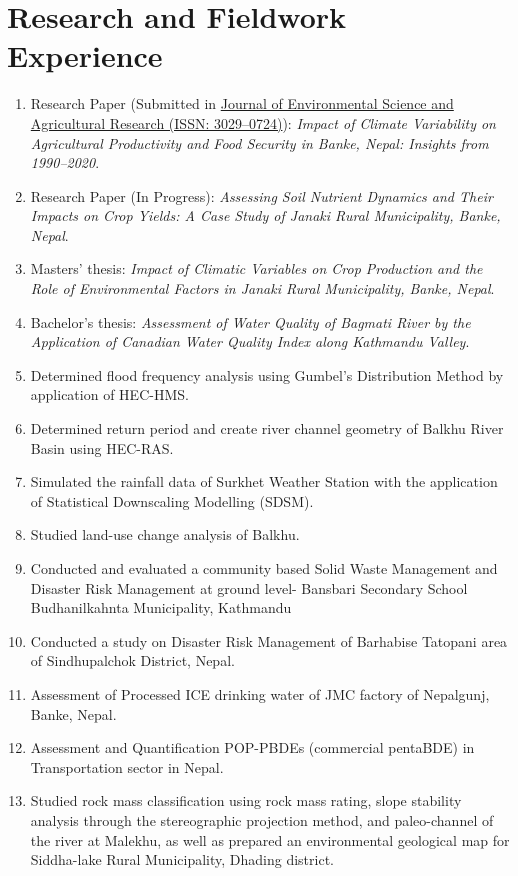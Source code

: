 \documentclass[a4paper,11.5pt]{article}
\begin{document}
\section{Research and Fieldwork Experience}
\begin{enumerate}
    \item Research Paper (Submitted in \href{https://oaskpublishers.com/journal-of-environmental-science-and-agricultural-research-jesar-home}{Journal of Environmental Science and Agricultural Research (ISSN: 3029--0724)}): \textit{Impact of Climate Variability on Agricultural Productivity and Food Security in Banke, Nepal: Insights from 1990--2020}.
    \item Research Paper (In Progress): \textit{Assessing Soil Nutrient Dynamics and Their Impacts on Crop Yields: A Case Study of Janaki Rural Municipality, Banke, Nepal}.
    \item Masters’ thesis: \textit{Impact of Climatic Variables on Crop Production and the Role of Environmental Factors in Janaki Rural Municipality, Banke, Nepal}.
    \item Bachelor's thesis: \textit{Assessment of Water Quality of Bagmati River by the Application of Canadian Water Quality Index along Kathmandu Valley}.
    \item Determined flood frequency analysis using Gumbel’s Distribution Method by application of HEC-HMS.
    \item Determined return period and create river channel geometry of Balkhu River Basin using HEC-RAS.
    \item Simulated the rainfall data of Surkhet Weather Station with the application of Statistical Downscaling Modelling (SDSM).
    \item Studied land-use change analysis of Balkhu.
    \item Conducted and evaluated a community based Solid Waste Management and Disaster Risk Management at ground level- Bansbari Secondary School Budhanilkahnta Municipality, Kathmandu
    \item Conducted a study on Disaster Risk Management of Barhabise Tatopani area of Sindhupalchok District, Nepal.
    \item Assessment of Processed ICE drinking water of JMC factory
    of Nepalgunj, Banke, Nepal.
    \item Assessment and Quantification POP-PBDEs (commercial pentaBDE) in Transportation sector in Nepal.
    \item Studied rock mass classification using rock mass rating, slope stability analysis through the  stereographic projection method, and paleo-channel of the river at Malekhu, as well as prepared an environmental geological map for Siddha-lake Rural Municipality, Dhading district.

\end{enumerate}
\end{document}
